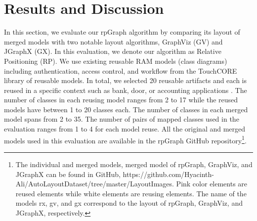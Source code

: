 \section{Results and Discussion}\label{discussion}
In this section, we  evaluate our rpGraph algorithm by comparing its layout of merged models with two notable layout algorithms, GraphViz (GV) and JGraphX (GX). In this evaluation, we denote our algorithm as Relative Positioning (RP). We use existing reusable RAM models (class diagrams) including authentication, access control, and workflow from the TouchCORE library of reusable models. In total, we selected 20 reusable artifacts and each is reused in a specific context such as bank, door, or accounting applications . The number of classes in each reusing model ranges from 2 to 17 while the reused models have between 1 to 20 classes each. The number of classes in each merged model spans from 2 to 35. The number of pairs of mapped classes used in the evaluation ranges from 1 to 4 for each model reuse. All the original and merged models used in this evaluation are available in the rpGraph GitHub repository\footnote{The individual and merged models, merged model of rpGraph, GraphViz, and JGraphX can be found in GitHub, https://github.com/Hyacinth-Ali/AutoLayoutDataset/tree/master/LayoutImages. Pink color elements are reused elements while white elements are reusing elements. The name of the models rx, gv, and gx correspond to the layout of rpGraph, GraphViz, and JGraphX, respectively.}. 


